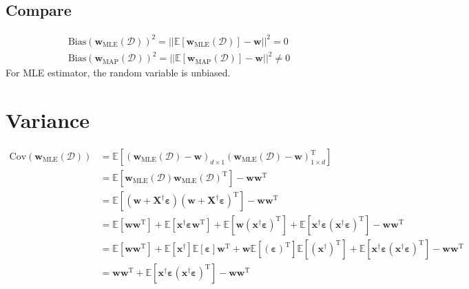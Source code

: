 \documentclass{article}
\begin{document}
\subsection{Compare}
\begin{equation}
    \begin{aligned}
        \text{Bias}(\mathbf{w}_{\text{MLE}}(\mathcal{D}))^2 = ||\mathbb{E}[\mathbf{w}_{\text{MLE}}(\mathcal{D})] - \mathbf{w}||^2 = 0\\
        \text{Bias}(\mathbf{w}_{\text{MAP}}(\mathcal{D}))^2 = ||\mathbb{E}[\mathbf{w}_{\text{MAP}}(\mathcal{D})] - \mathbf{w}||^2 \neq 0
    \end{aligned}
\end{equation}
For MLE estimator, the random variable is unbiased.

\section{Variance}
\begin{equation}\label{MLE covariance}
    \begin{aligned}
        \text{Cov}(\mathbf{w}_{\text{MLE}}(\mathcal{D})) 
        &= \mathbb{E}[(\mathbf{w}_{\text{MLE}}(\mathcal{D}) - \mathbf{w})_{d\times 1} (\mathbf{w}_{\text{MLE}}(\mathcal{D}) - \mathbf{w})_{1\times d}^{\mathrm{T}}]\\
        &= \mathbb{E}[\mathbf{w}_{\text{MLE}}(\mathcal{D}) \mathbf{w}_{\text{MLE}}(\mathcal{D})^{\mathrm{T}}] - \mathbf{w}\mathbf{w}^{\mathrm{T}}\\
        &= \mathbb{E}[(\mathbf{w} + \mathbf{X}^{\dag} \boldsymbol{\varepsilon})(\mathbf{w} + \mathbf{X}^{\dag} \boldsymbol{\varepsilon})^{\mathrm{T}}] - \mathbf{w}\mathbf{w}^{\mathrm{T}}\\
        &= \mathbb{E}[\mathbf{w} \mathbf{w}^{\mathrm{T}}] + \mathbb{E}[\mathbf{x}^{\dag} \boldsymbol{\varepsilon} \mathbf{w}^{\mathrm{T}}] + \mathbb{E}[\mathbf{w} (\mathbf{x}^{\dag} \boldsymbol{\varepsilon})^{\mathrm{T}}] + \mathbb{E}[\mathbf{x}^{\dag} \boldsymbol{\varepsilon} (\mathbf{x}^{\dag} \boldsymbol{\varepsilon})^{\mathrm{T}}] - \mathbf{w}\mathbf{w}^{\mathrm{T}}\\
        &= \mathbb{E}[\mathbf{w} \mathbf{w}^{\mathrm{T}}] +  \mathbb{E}[\mathbf{x}^{\dag}] \mathbb{E}[\boldsymbol{\varepsilon}] \mathbf{w}^{\mathrm{T}} + \mathbf{w} \mathbb{E}[(\boldsymbol{\varepsilon})^{\mathrm{T}}] \mathbb{E}[(\mathbf{x}^{\dag})^{\mathrm{T}}] + \mathbb{E}[\mathbf{x}^{\dag} \boldsymbol{\varepsilon} (\mathbf{x}^{\dag} \boldsymbol{\varepsilon})^{\mathrm{T}}] - \mathbf{w}\mathbf{w}^{\mathrm{T}}\\
        &= \mathbf{w} \mathbf{w}^{\mathrm{T}} + \mathbb{E}[\mathbf{x}^{\dag} \boldsymbol{\varepsilon} (\mathbf{x}^{\dag} \boldsymbol{\varepsilon})^{\mathrm{T}}] - \mathbf{w}\mathbf{w}^{\mathrm{T}}\\
    \end{aligned}
\end{equation}
\end{document}
